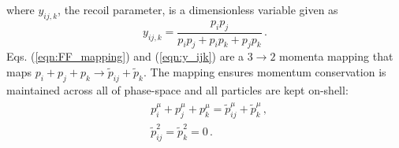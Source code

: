 \documentclass[main.tex]{subfiles}
\begin{document}
        where $y_{ij,k}$, the recoil parameter, is a dimensionless variable given as
        \begin{equation}\label{eqn:y_ijk}
            y_{ij,k} = \dfrac{p_{i}p_{j}}{p_{i}p_{j} + p_{i}p_{k} + p_{j}p_{k}} \, .
        \end{equation}
        Eqs. (\ref{eqn:FF_mapping}) and (\ref{eqn:y_ijk})
        are a $3 \rightarrow 2$ momenta mapping that maps
        $p_{i} + p_{j} + p_{k} \rightarrow \tilde{p}_{ij} + \tilde{p}_{k}$.
        The mapping ensures momentum conservation is maintained across all of phase-space and
        all particles are kept on-shell:
        \begin{align}\label{eqn:mapping_conditions}
            \begin{split}
                &p_{i}^{\mu} + p_{j}^{\mu} + p_{k}^{\mu} = \tilde{p}_{ij}^{\mu} + \tilde{p}_{k}^{\mu} \, , \\
                &\tilde{p}_{ij}^{2} = \tilde{p}_{k}^{2} = 0 \, .
            \end{split}
        \end{align}
\end{document}
